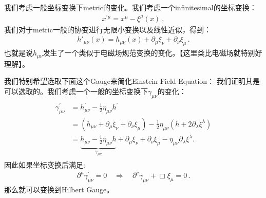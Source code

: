 我们考虑一般坐标变换下metric的变化。我们考虑一个infinitesimal的坐标变换：
\begin{align}
  x^{\prime\mu}=x^\mu-\xi^\mu(x)\mathrm{~,}
\end{align}
我们对于metric一般的协变进行无限小变换以及线性近似，得到：
\begin{align}
  h'_{\mu\nu}(x) = h_{\mu\nu}(x) + \partial_\mu \xi_\nu +
  \partial_\nu \xi_\mu \, .
\end{align}
也就是说$ h_{\mu\nu} $发生了一个类似于电磁场规范变换的变化。【这里类比电磁场就特别好理解】。

\bigskip
{}

我们特别希望选取下面这个Gauge来简化Einstein Field Equation：
我们证明其是可以选取的。我们考虑一个一般的坐标变换下$ \gamma_{\mu\nu} $的变化：
\begin{align}\label{eq:gammatransform}
  \begin{aligned}\gamma_{\mu\nu}^{\prime}&=h_{\mu\nu}^{\prime}-\frac{1}{2}\eta_{\mu\nu}h^{\prime}\\&=\left(h_{\mu\nu}+\partial_\mu\xi_\nu+\partial_\nu\xi_\mu\right)-\frac{1}{2}\eta_{\mu\nu}\left(h+2\partial_\lambda\xi^\lambda\right)\\&=\underbrace{h_{\mu\nu}-\frac{1}{2}\eta_{\mu\nu}h}_{\gamma_{\mu\nu}}+\partial_\mu\xi_\nu+\partial_\nu\xi_\mu-\eta_{\mu\nu}\partial_\lambda\xi^\lambda.
  \end{aligned}
\end{align}
因此如果坐标变换后满足:
\begin{align}\label{eq:hilbertgaugecondition}
  \partial^\mu \gamma_{\mu\nu}^{\prime} = 0 \quad \Rightarrow \quad
  \partial^\nu \gamma_{\mu\nu} + \Box \xi_\mu = 0 \, .
\end{align}
那么就可以变换到Hilbert Gauge。

\bigskip
{}

